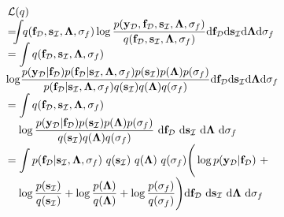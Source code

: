 \documentclass[conference]{IEEEtran}
\begin{document}
	\begin{equation*}
		\hspace{-1.7mm}
		\begin{array}{l}
			\mathcal{L}(q)\\
			\displaystyle=\hspace{-2mm}\int \hspace{-1mm} q(\mathbf{f}_\mathcal{D},\mathbf{s}_\mathcal{I},\mathbf{\Lambda},\sigma_f)\log\dfrac{p(\mathbf{y}_\mathcal{D},\mathbf{f}_\mathcal{D},\mathbf{s}_\mathcal{I},\mathbf{\Lambda},\sigma_f)}{q(\mathbf{f}_\mathcal{D},\mathbf{s}_\mathcal{I},\mathbf{\Lambda},\sigma_f)} \mathrm{d}\mathbf{f}_\mathcal{D}\mathrm{d}\mathbf{s}_\mathcal{I} \mathrm{d}\mathbf{\Lambda}\mathrm{d}\sigma_f \vspace{-1mm}
			\\
			\displaystyle=\int q(\mathbf{f}_\mathcal{D},\mathbf{s}_\mathcal{I},\mathbf{\Lambda},\sigma_f) \\ 
			\displaystyle \hspace{-0.5mm}\log\hspace{-0.5mm}\dfrac{p(\mathbf{y}_\mathcal{D}|\mathbf{f}_\mathcal{D})p(\mathbf{f}_\mathcal{D}|\mathbf{s}_\mathcal{I},\mathbf{\Lambda},\sigma_f)p(\mathbf{s}_\mathcal{I})p(\mathbf{\Lambda})p(\sigma_f)}{p(\mathbf{f}_\mathcal{D}|\mathbf{s}_\mathcal{I},\mathbf{\Lambda},\sigma_f)q(\mathbf{s}_\mathcal{I})q(\mathbf{\Lambda})q(\sigma_f)} \mathrm{d}\mathbf{f}_\mathcal{D} \mathrm{d}\mathbf{s}_\mathcal{I} \mathrm{d}\mathbf{\Lambda} \mathrm{d}\sigma_f %
			\\
			\displaystyle=\int q(\mathbf{f}_\mathcal{D},\mathbf{s}_\mathcal{I},\mathbf{\Lambda},\sigma_f)\\
			\quad\displaystyle\log \dfrac{p(\mathbf{y}_\mathcal{D}|\mathbf{f}_\mathcal{D})p(\mathbf{s}_\mathcal{I})p(\mathbf{\Lambda})p(\sigma_f)}{q(\mathbf{s}_\mathcal{I})q(\mathbf{\Lambda})q(\sigma_f)}\ \mathrm{d}\mathbf{f}_\mathcal{D}\ \mathrm{d}\mathbf{s}_\mathcal{I}\ \mathrm{d}\mathbf{\Lambda}\  \mathrm{d}\sigma_f\\
			\displaystyle=\int p(\mathbf{f}_\mathcal{D}|\mathbf{s}_\mathcal{I},\mathbf{\Lambda},\sigma_f)\ q(\mathbf{s}_\mathcal{I})\ q(\mathbf{\Lambda})\ q(\sigma_f)\Bigg(\log p(\mathbf{y}_\mathcal{D}|\mathbf{f}_\mathcal{D})\ +\\
			\quad\displaystyle\log\dfrac{p(\mathbf{s}_\mathcal{I})}{q(\mathbf{s}_\mathcal{I})}+\log\dfrac{p(\mathbf{\Lambda})}{q(\mathbf{\Lambda})}+\log\dfrac{p(\sigma_f)}{q(\sigma_f)}\Bigg) \mathrm{d}\mathbf{f}_\mathcal{D}\ \mathrm{d}\mathbf{s}_\mathcal{I}\ \mathrm{d}\mathbf{\Lambda}\ \mathrm{d}\sigma_f\vspace{0mm}\\

\end{array}
\end{equation*}
\end{document}
